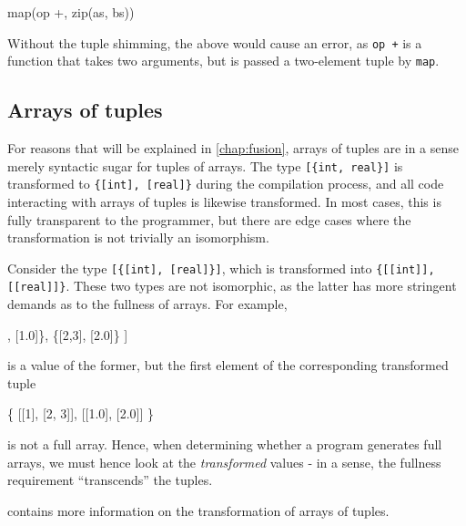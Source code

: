 \begin{colorcode}
  map(op +, zip(as, bs))
\end{colorcode}

Without the tuple shimming, the above would cause an error, as
\texttt{op +} is a function that takes two arguments, but is passed a
two-element tuple by \texttt{map}.

\subsection{Arrays of tuples}

For reasons that will be explained in \cref{chap:fusion},
arrays of tuples are in a sense merely syntactic sugar for tuples of
arrays.  The type \texttt{[\{int, real\}]} is transformed to
\texttt{\{[int], [real]\}} during the compilation process, and all
code interacting with arrays of tuples is likewise transformed.  In
most cases, this is fully transparent to the programmer, but there are
edge cases where the transformation is not trivially an isomorphism.

Consider the type \texttt{[\{[int], [real]\}]}, which is transformed
into \texttt{\{[[int]], [[real]]\}}.  These two types are not
isomorphic, as the latter has more stringent demands as to the
fullness of arrays.  For example,
\begin{colorcode}
[
 \{[1],   [1.0]\},
 \{[2,3], [2.0]\}
]
\end{colorcode}
is a value of the former, but the first element of the
corresponding transformed tuple
\begin{colorcode}
\{
 [[1],   [2, 3]],
 [[1.0], [2.0]]
\}
\end{colorcode}
is not a full array.  Hence, when determining whether a program
generates full arrays, we must hence look at the \textit{transformed}
values - in a sense, the fullness requirement ``transcends'' the
tuples.

 contains more information on the
transformation of arrays of tuples.

